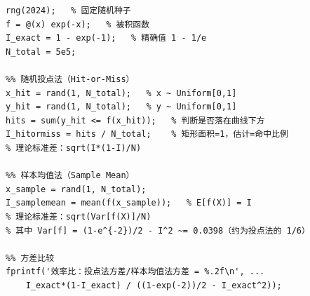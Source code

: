 \documentclass[UTF8,a4paper,11pt]{article}
\begin{document}
\begin{lstlisting}[style=matlab, caption={problem4\_monte\_carlo.m（核心算法）}]
rng(2024);   % 固定随机种子
f = @(x) exp(-x);   % 被积函数
I_exact = 1 - exp(-1);   % 精确值 1 - 1/e
N_total = 5e5;

%% 随机投点法（Hit-or-Miss）
x_hit = rand(1, N_total);   % x ~ Uniform[0,1]
y_hit = rand(1, N_total);   % y ~ Uniform[0,1]
hits = sum(y_hit <= f(x_hit));   % 判断是否落在曲线下方
I_hitormiss = hits / N_total;    % 矩形面积=1，估计=命中比例
% 理论标准差：sqrt(I*(1-I)/N)

%% 样本均值法（Sample Mean）
x_sample = rand(1, N_total);
I_samplemean = mean(f(x_sample));   % E[f(X)] = I
% 理论标准差：sqrt(Var[f(X)]/N)
% 其中 Var[f] = (1-e^{-2})/2 - I^2 ~= 0.0398（约为投点法的 1/6）

%% 方差比较
fprintf('效率比：投点法方差/样本均值法方差 = %.2f\n', ...
    I_exact*(1-I_exact) / ((1-exp(-2))/2 - I_exact^2));
\end{lstlisting}
\end{document}
